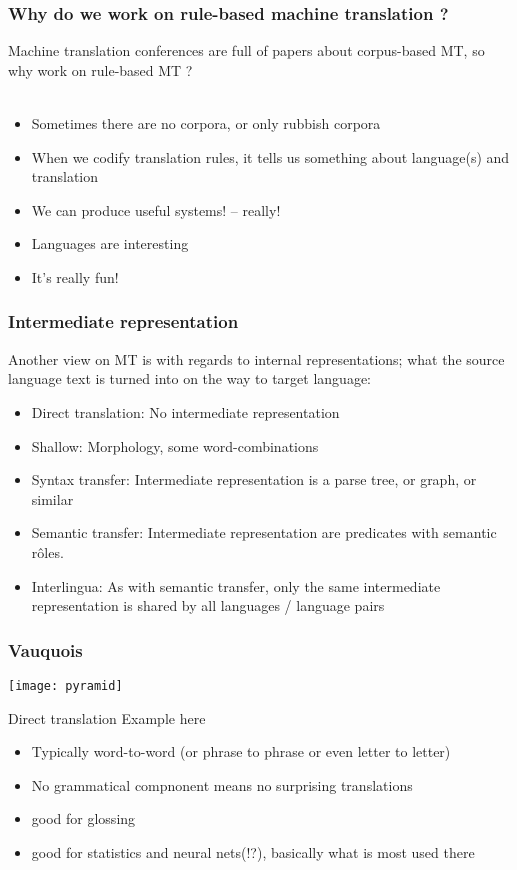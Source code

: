 \documentclass{beamer}
\begin{document}
\begin{frame}
  \frametitle{Why do we work on rule-based machine translation ?}
Machine translation conferences are full of papers about corpus-based MT, so why  
work on rule-based MT ? \\
~\\ 
\begin{itemize} 
  \item Sometimes there are no corpora, or only rubbish corpora
  \item When we codify translation rules, it tells us something about language(s) and translation
  \item We can produce useful systems! -- really!
  \item Languages are interesting
  \item It's really fun!
\end{itemize}

\end{frame}


\begin{frame}
  \frametitle{Intermediate representation}

Another view on MT is with regards to internal representations; what
the source language text is turned into on the way to target language:

\begin{itemize}
  \item Direct translation: No intermediate representation
  \item Shallow: Morphology, some word-combinations
  \item Syntax transfer: Intermediate representation is a parse tree, or graph,
      or similar
  \item Semantic transfer: Intermediate representation are predicates with
      semantic rôles.
  \item Interlingua: As with semantic transfer, only the same 
     intermediate representation is shared by all languages / language pairs
\end{itemize} 


\end{frame}



\begin{frame}
  \frametitle{Vauquois}

\centering
\texttt{[image: pyramid]}

\end{frame}

\begin{frame}{Direct translation}
    Example here
    \begin{itemize}
        \item Typically word-to-word (or phrase to phrase or even letter
            to letter)
        \item No grammatical compnonent means no surprising translations
        \item good for glossing
        \item good for statistics and neural nets(!?), basically what is
            most used there
    \end{itemize}
\end{frame}
\end{document}
